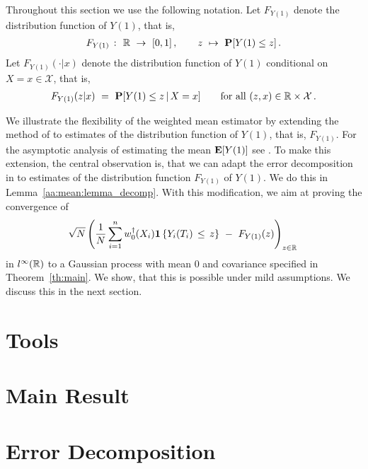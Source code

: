 Throughout this section we use the following notation.
Let $F_{Y(1)}$ denote the distribution function of $Y(1)$, that is,
\begin{gather*}
  F_{Y(1)}
  \ 
  \colon
  \ 
  \R
  \ 
  \to
  \ 
  [0,1]
  \, 
  , 
  \qquad
  z
  \ 
  \mapsto
  \ 
  \P
  [
  Y(1)
  \le
  z
  ]
  \,.
\end{gather*}
Let $F_{Y(1)}(\cdot|x)$ denote the distribution function of $Y(1)$ conditional on $X=x\in\mathcal{X}$, that is,
\begin{gather}
  \label{3228}
  F_{Y(1)}
  (z|x)
\ 
  =
\ 
  \P
  [
  Y(1)
  \le
  z
  \,
  |
  \,
  X=x
  ]
  \qquad
  \text{for all}\ 
  (z,x)\in\R\times\mathcal{X}
  \,.
\end{gather}

We illustrate the flexibility of 
the weighted mean estimator by 
extending the method of \cite{Wang2019} to
estimates of 
the distribution function of $Y(1)$, that is, $F_{Y(1)}$.
For the asymptotic analysis of estimating the mean $\mathbf{E}[Y(1)]$ see \cite[Proof of Theorem~3]{Wang2019}.
To make this extension, the central observation is, that we can adapt the error decomposition in \cite[page 27]{Wang2019} 
to estimates of the distribution function $F_{Y(1)}$ of $Y(1)$.
We do this in Lemma~\ref{aa:mean:lemma_decomp}.
With this modification, we aim at proving
the convergence of
\begin{gather}
    \sqrt{N}
    \left( 
  \frac{1}{N}
    \sum_{i=1}^{n} 
    w_0^\dagger(X_i)
    \mathbf{1}\left\{ Y_i(T_i)\,\le\, z \right\}
    \ 
    -
    \ 
    F_{Y(1)}(z)
    \right)
    _{z\in\R}
    \,
  \end{gather}
  in
  $l^\infty(\mathbb{R})$
  to a Gaussian process with mean 0 and covariance specified in Theorem~\ref{th:main}.
  We show, that this is possible under mild assumptions.
  We discuss this in the next section.

\section{Tools}
  
\section{Main Result}
  
\section{Error Decomposition}
  
